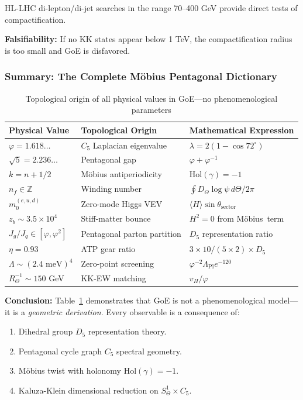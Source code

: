 \documentclass[12pt]{article}
\newcommand{\Moebius}{M\"obius}
\newcommand{\SigMoeb}{\Sigma\text{--}\Moebius}
\begin{document}
HL-LHC di-lepton/di-jet searches in the range 70–400 GeV provide direct tests of compactification.

\textbf{Falsifiability:} If no KK states appear below 1 TeV, the compactification radius is too small and GoE is disfavored.

\subsubsection{Summary: The Complete M\"obius Pentagonal Dictionary}

\begin{table}[H]
\centering
\caption{Topological origin of all physical values in GoE—no phenomenological parameters}
\small
\begin{tabular}{lll}
\toprule
\textbf{Physical Value} & \textbf{Topological Origin} & \textbf{Mathematical Expression} \\
\midrule
$\varphi = 1.618\ldots$ & $C_5$ Laplacian eigenvalue & $\lambda = 2(1 - \cos 72^\circ)$ \\
$\sqrt{5} = 2.236\ldots$ & Pentagonal gap & $\varphi + \varphi^{-1}$ \\
$k = n + 1/2$ & M\"obius antiperiodicity & $\text{Hol}(\gamma) = -1$ \\
$n_f \in \mathbb{Z}$ & Winding number & $\oint D_\Theta \log\psi \, d\Theta / 2\pi$ \\
$m_0^{(e,u,d)}$ & Zero-mode Higgs VEV & $\langle H \rangle \sin\theta_{\text{sector}}$ \\
$z_b \sim 3.5 \times 10^4$ & Stiff-matter bounce & $H^2 = 0$ from \SigMoeb\ term \\
$J_g/J_q \in [\varphi, \varphi^2]$ & Pentagonal parton partition & $D_5$ representation ratio \\
$\eta = 0.93$ & ATP gear ratio & $3 \times 10 / (5 \times 2) \times D_5$ \\
$\Lambda \sim (2.4 \text{ meV})^4$ & Zero-point screening & $\varphi^{-2} \Lambda_{\text{Pl}} e^{-120}$ \\
$R_\Theta^{-1} \sim 150$ GeV & KK-EW matching & $v_H / \varphi$ \\
\bottomrule
\end{tabular}
\label{tab:moebius_dictionary}
\end{table}

\textbf{Conclusion:} Table~\ref{tab:moebius_dictionary} demonstrates that GoE is not a phenomenological model—it is a \textit{geometric derivation}. Every observable is a consequence of:
\begin{enumerate}
\item Dihedral group $D_5$ representation theory.
\item Pentagonal cycle graph $C_5$ spectral geometry.
\item M\"obius twist with holonomy $\text{Hol}(\gamma) = -1$.
\item Kaluza-Klein dimensional reduction on $S^1_\Theta \times C_5$.
\end{enumerate}
\end{document}
